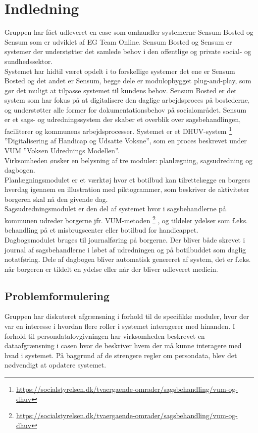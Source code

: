 \chapter{Indledning}
Gruppen har fået udleveret en case som omhandler systemerne Sensum Bosted og Sensum som er udviklet af EG Team Online. Sensum Bosted og Sensum er systemer der understøtter det samlede behov i den offentlige og private social- og sundhedssektor.\\
Systemet har hidtil været opdelt i to forskellige systemer det ene er Sensum Bosted og det andet er Sensum, begge dele er modulopbygget plug-and-play, som gør det muligt at tilpasse systemet til kundens behov. Sensum Bosted er det system som har fokus på at digitalisere den daglige arbejdsproces på bostederne, og understøtter alle former for dokumentationsbehov på socialområdet. Sensum er et sags- og udredningssystem der skaber et overblik over sagsbehandlingen, faciliterer og kommunens arbejdsprocesser. Systemet er et DHUV-system 
\footnote{\url{https://socialstyrelsen.dk/tvaergaende-omrader/sagsbehandling/vum-og-dhuv}} 
 ”Digitalisering af Handicap og Udsatte Voksne”, som en proces beskrevet under VUM ”Voksen Udrednings Modellen”.\\
Virksomheden ønsker en belysning af tre moduler: planlægning, sagsudredning og dagbogen.\\
Planlægningsmodulet er et værktøj hvor et botilbud kan tilrettelægge en borgers hverdag igennem en illustration med piktogrammer, som beskriver de aktiviteter borgeren skal nå den givende dag.\\
Sagsudredningsmodulet er den del af systemet hvor i sagsbehandlerne på kommunen udreder borgerne jfr. VUM-metoden 
\footnote{\url{https://socialstyrelsen.dk/tvaergaende-omrader/sagsbehandling/vum-og-dhuv}}
 , og tildeler ydelser som f.eks. behandling på et misbrugscenter eller botilbud for handicappet.\\
Dagbogsmodulet bruges til journalføring på borgerne. Der bliver både skrevet i journal af sagsbehandlerne i løbet af udredningen og på botilbuddet som daglig notatføring. Dele af dagbogen bliver automatisk genereret af system, det er f.eks. når borgeren er tildelt en ydelse eller når der bliver udleveret medicin.\\

\section{Problemformulering}

Gruppen har diskuteret afgrænsning i forhold til de specifikke moduler, hvor der var en interesse i hvordan flere roller i systemet interagerer med hinanden. I forhold til persondatalovgivningen har virksomheden beskrevet en dataafgrænsning i casen hvor de beskriver hvem der må kunne interagere med hvad i systemet. På baggrund af de strengere regler om persondata, blev det nødvendigt at opdatere systemet.


